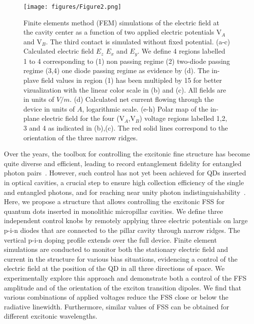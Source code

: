 \documentclass[article,twocolumn, superscriptaddress, 10pt, nofootinbib]{revtex4-1}%
\begin{document}
\begin{figure*}
    \texttt{[image: figures/Figure2.png]}
    \caption{ Finite elements method (FEM)  simulations of the electric field at the cavity center as a function of two applied electric potentials V$_A$ and V$_B$. The third contact is simulated without fixed potential.{ (a-c) Calculated electric field $E_z$  $E_x$ and $E_y$. We define 4 regions labelled 1 to 4 corresponding to (1) non passing regime (2) two-diode passing regime (3,4) one diode passing regime as evidence by (d). The in-plave field values in region (1) has been multipled by 15 for better vizualization with the linear color scale in (b) and (c).  All fields are in units of $V/m$. (d) Calculated net current flowing through the device {in units of $A$, logarithmic scale}.  (e-h) Polar map of the in-plane electric field for the four (V$_A$,V$_B$) voltage regions labelled 1,2, 3 and 4 as indicated in (b),(c). The red solid lines correspond to the orientation of the three narrow ridges.}}
    \label{fig2}
\end{figure*}


Over the years, the toolbox for controlling the excitonic fine structure has become quite diverse and efficient, leading to  record entanglement fidelity for entangled photon pairs~\cite{huber2018}. However, such control has not yet been achieved for QDs inserted in optical cavities,  a crucial step to ensure high collection efficiency of the single and entangled photons\cite{Wang2016,Somaschi2016,dousse_ultrabright_2010}, and for reaching near unity {photon}  indistinguishability~\cite{Somaschi2016,Wang2016,Tomm2021}.
\\

Here, we propose a structure that allows controlling the excitonic FSS for quantum dots inserted in monolithic micropillar cavities. We define three independent control knobs by remotely applying three electric potentials on large p-i-n diodes that are connected to the pillar cavity through narrow ridges. {The vertical p-i-n doping profile extends over the full device.} Finite element simulations are conducted to monitor both the stationary electric field and current in the structure for various bias situations, evidencing a control of the electric field at the position of the QD in all three directions of space. We experimentally explore this approach and {demonstrate both a control of the FFS amplitude and of the orientation of the {exciton transition} dipoles. We find that various combinations of applied voltages  reduce the FSS close or below the radiative linewidth. Furthermore,  similar values of FSS can be obtained for  different excitonic wavelengths.}
\end{document}
